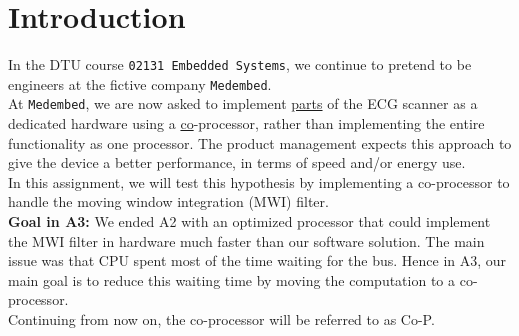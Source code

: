 \vspace*{1cm}
\section{Introduction}\label{sec:introduction}
In the DTU course \texttt{02131 Embedded Systems}, we continue to pretend to be engineers at the fictive company \texttt{Medembed}.\\
 
At \texttt{Medembed}, we are now asked to implement \underline{parts} of the ECG scanner as a dedicated hardware using a  \underline{co}-processor, rather than implementing the entire functionality as one processor. The product management expects this approach to give the device a better performance, in terms of speed and/or energy use.\\

In this assignment, we will test this hypothesis by implementing a co-processor to handle the moving window integration (MWI) filter. \\

\textbf{Goal in A3:} We ended A2 with an optimized processor that could implement the MWI filter in hardware much faster than our software solution. The main issue was that CPU spent most of the time waiting for the bus. Hence in A3, our main goal is to reduce this waiting time by moving the computation to a co-processor. \\

Continuing from now on, the co-processor will be referred to as Co-P. 

